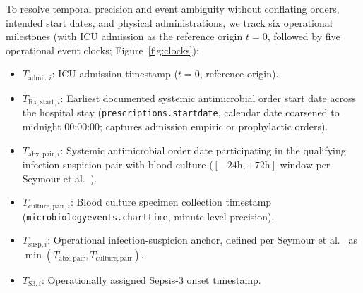 \documentclass[10pt,twocolumn,a4paper]{article}
\begin{document}
To resolve temporal precision and event ambiguity without conflating orders, intended start dates, and physical administrations, we track six operational milestones (with ICU admission as the reference origin $t=0$, followed by five operational event clocks; Figure~\ref{fig:clocks}):
\begin{itemize}
    \setlength{\itemsep}{0pt}
    \setlength{\parsep}{0pt}
    \setlength{\parskip}{0pt}
    \item $T_{\text{admit}, i}$: ICU admission timestamp ($t=0$, reference origin).
    \item $T_{\mathrm{Rx,start}, i}$: Earliest documented systemic antimicrobial order start date across the hospital stay (\texttt{prescriptions.\allowbreak startdate}, calendar date coarsened to midnight 00:00:00; captures admission empiric or prophylactic orders).
    \item $T_{\mathrm{abx,pair}, i}$: Systemic antimicrobial order date participating in the qualifying infection-suspicion pair with blood culture ($[-24\text{h}, +72\text{h}]$ window per Seymour et al.~\cite{seymour2016assessment}).
    \item $T_{\mathrm{culture,pair}, i}$: Blood culture specimen collection timestamp (\texttt{microbiologyevents.charttime}, minute-level precision).
    \item $T_{\mathrm{susp}, i}$: Operational infection-suspicion anchor, defined per Seymour et al.~\cite{seymour2016assessment} as $\min(T_{\mathrm{abx,pair}}, T_{\mathrm{culture,pair}})$.
    \item $T_{\text{S3}, i}$: Operationally assigned Sepsis-3 onset timestamp.
\end{itemize}
\end{document}
